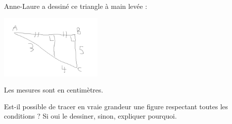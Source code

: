 
\begin{exercice}\label{exo2smath-0093}

    Anne-Laure a dessiné ce triangle à main levée :

    \begin{center}
        \includegraphics[width=5cm]{faux_triangle.pdf}
    \end{center}
    Les mesures sont en centimètres.

    Est-il possible de tracer en vraie grandeur une figure respectant toutes les conditions ? Si oui le dessiner, sinon, expliquer pourquoi.


\end{exercice}
